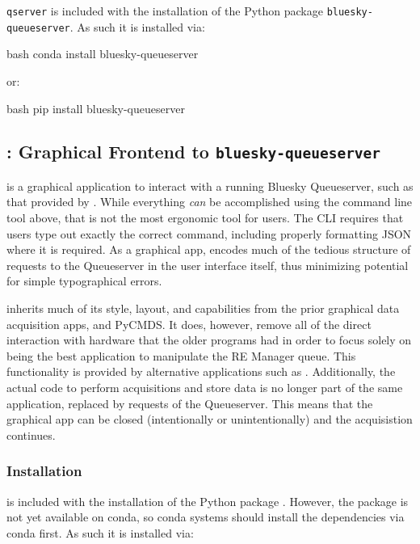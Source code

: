 \texttt{qserver} is included with the installation of the Python package \texttt{bluesky-queueserver}.
As such it is installed via:

\begin{codefragment}{bash}
conda install bluesky-queueserver
\end{codefragment}

or:

\begin{codefragment}{bash}
pip install bluesky-queueserver
\end{codefragment}

\subsection{\blueskycmds: Graphical Frontend to \texttt{bluesky-queueserver}}

\blueskycmds is a graphical application to interact with a running Bluesky Queueserver, such as that provided by \biab.
While everything \textit{can} be accomplished using the command line tool above, that is not the most ergonomic tool for users.
The CLI requires that users type out exactly the correct command, including properly formatting JSON where it is required.
As a graphical app, \blueskycmds encodes much of the tedious structure of requests to the Queueserver in the user interface itself, thus minimizing potential for simple typographical errors.

\blueskycmds inherits much of its style, layout, and capabilities from the prior graphical data acquisition apps, \yaqccmds and PyCMDS.
It does, however, remove all of the direct interaction with hardware that the older programs had in order to focus solely on being the best application to manipulate the RE Manager queue.
This functionality is provided by alternative applications such as \yaqcqtpy.
Additionally, the actual code to perform acquisitions and store data is no longer part of the same application, replaced by requests of the Queueserver.
This means that the graphical app can be closed (intentionally or unintentionally) and the acquisistion continues.

\subsubsection{Installation}

\blueskycmds is included with the installation of the Python package \blueskycmds.
However, the package is not yet available on conda, so conda systems should install the dependencies via conda first.
As such it is installed via:

